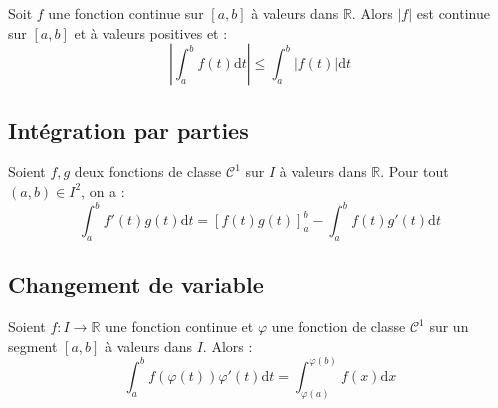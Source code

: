 \documentclass[french,11pt,twoside]{VcCours}
\newcommand{\dx}{\text{d}x}
\newcommand{\dt}{\text{d}t}
\begin{document}
%
%

\begin{Proposition}{} Soit $f$ une fonction continue sur $[a,b]$ à valeurs dans $\mathbb{R}$. Alors $\vert f \vert$ est continue sur $[a,b]$ et à valeurs positives et :
$$ \left\vert \int_{a}^b f(t) \dt \right\vert \leq \int_{a}^b \vert f(t) \vert \dt $$
\end{Proposition}




\subsection{Intégration par parties}
\begin{Theoreme}{} Soient $f,g$ deux fonctions de classe $\mathcal{C}^1$ sur $I$ à valeurs dans $\mathbb{R}$. Pour tout $(a,b) \in I^2$, on a :
$$ \int_{a}^b f'(t) g(t) \dt = \left[ f(t) g(t) \right]_a^b - \int_{a}^b f(t) g'(t) \dt$$
\end{Theoreme}
%

\subsection{Changement de variable}

\begin{Theoreme}{} Soient $f : I \rightarrow \mathbb{R}$ une fonction continue et $\varphi$ une fonction de classe $\mathcal{C}^1$ sur un segment $[a,b]$ à valeurs dans $I$. Alors :
$$ \int_{a}^b f(\varphi(t)) \varphi'(t) \dt = \int_{\varphi(a)}^{\varphi(b)} f(x) \dx$$
\end{Theoreme}
\end{document}
